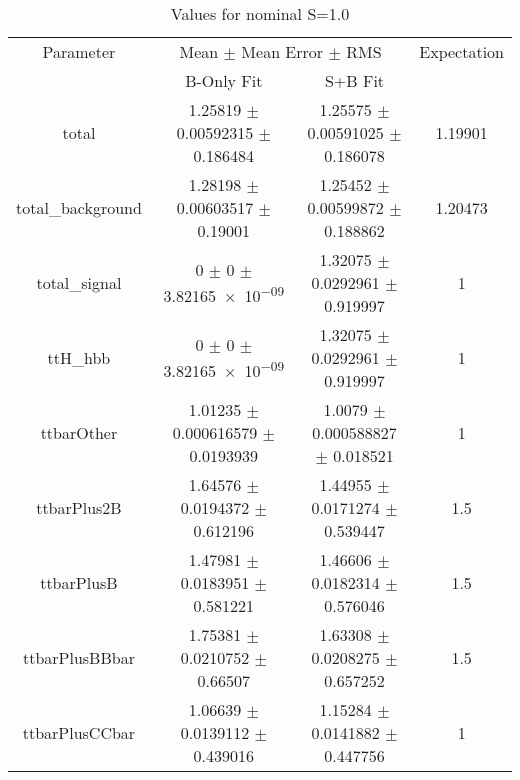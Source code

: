 \begin{table}
\centering
\caption{Values for nominal S=1.0}
\begin{tabular}{cccc}
\toprule
Parameter & \multicolumn{2}{c}{Mean $\pm$ Mean Error $\pm$ RMS} & Expectation\\
 & B-Only Fit & S+B Fit & \\
\midrule
total & \num{1.25819} $\pm$ \num{0.00592315} $\pm$ \num{0.186484} & \num{1.25575} $\pm$ \num{0.00591025} $\pm$ \num{0.186078} & \num{1.19901}\\
total\_background & \num{1.28198} $\pm$ \num{0.00603517} $\pm$ \num{0.19001} & \num{1.25452} $\pm$ \num{0.00599872} $\pm$ \num{0.188862} & \num{1.20473}\\
total\_signal & \num{0} $\pm$ \num{0} $\pm$ \num{3.82165e-09} & \num{1.32075} $\pm$ \num{0.0292961} $\pm$ \num{0.919997} & \num{1}\\
ttH\_hbb & \num{0} $\pm$ \num{0} $\pm$ \num{3.82165e-09} & \num{1.32075} $\pm$ \num{0.0292961} $\pm$ \num{0.919997} & \num{1}\\
ttbarOther & \num{1.01235} $\pm$ \num{0.000616579} $\pm$ \num{0.0193939} & \num{1.0079} $\pm$ \num{0.000588827} $\pm$ \num{0.018521} & \num{1}\\
ttbarPlus2B & \num{1.64576} $\pm$ \num{0.0194372} $\pm$ \num{0.612196} & \num{1.44955} $\pm$ \num{0.0171274} $\pm$ \num{0.539447} & \num{1.5}\\
ttbarPlusB & \num{1.47981} $\pm$ \num{0.0183951} $\pm$ \num{0.581221} & \num{1.46606} $\pm$ \num{0.0182314} $\pm$ \num{0.576046} & \num{1.5}\\
ttbarPlusBBbar & \num{1.75381} $\pm$ \num{0.0210752} $\pm$ \num{0.66507} & \num{1.63308} $\pm$ \num{0.0208275} $\pm$ \num{0.657252} & \num{1.5}\\
ttbarPlusCCbar & \num{1.06639} $\pm$ \num{0.0139112} $\pm$ \num{0.439016} & \num{1.15284} $\pm$ \num{0.0141882} $\pm$ \num{0.447756} & \num{1}\\
\bottomrule
\end{tabular}
\end{table}